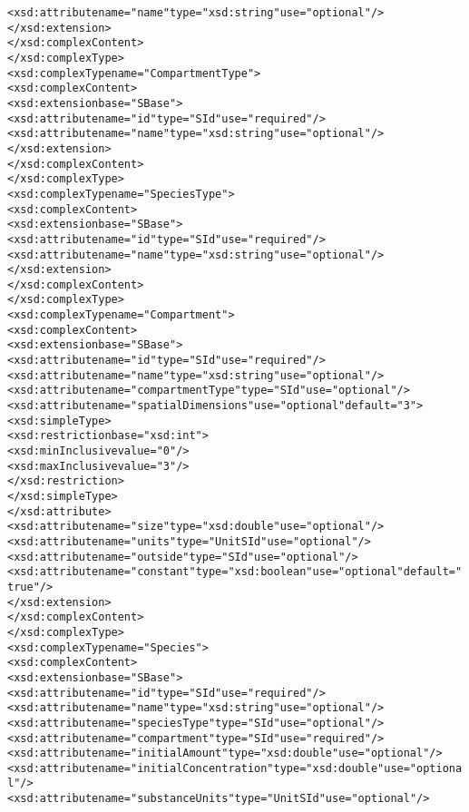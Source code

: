 \begin{alltt}
                <xsd:attribute name="name" type="xsd:string" use="optional"/>
            </xsd:extension>
        </xsd:complexContent>
    </xsd:complexType>
    <xsd:complexType name="CompartmentType">
        <xsd:complexContent>
            <xsd:extension base="SBase">
                <xsd:attribute name="id" type="SId" use="required"/>
                <xsd:attribute name="name" type="xsd:string" use="optional"/>
            </xsd:extension>
        </xsd:complexContent>
    </xsd:complexType>
    <xsd:complexType name="SpeciesType">
        <xsd:complexContent>
            <xsd:extension base="SBase">
                <xsd:attribute name="id" type="SId" use="required"/>
                <xsd:attribute name="name" type="xsd:string" use="optional"/>
            </xsd:extension>
        </xsd:complexContent>
    </xsd:complexType>
    <xsd:complexType name="Compartment">
        <xsd:complexContent>
            <xsd:extension base="SBase">
                <xsd:attribute name="id" type="SId" use="required"/>
                <xsd:attribute name="name" type="xsd:string" use="optional"/>
                <xsd:attribute name="compartmentType" type="SId" use="optional"/>
                <xsd:attribute name="spatialDimensions" use="optional" default="3">
                    <xsd:simpleType>
                        <xsd:restriction base="xsd:int">
                            <xsd:minInclusive value="0"/>
                            <xsd:maxInclusive value="3"/>
                        </xsd:restriction>
                    </xsd:simpleType>
                </xsd:attribute>
                <xsd:attribute name="size" type="xsd:double" use="optional"/>
                <xsd:attribute name="units" type="UnitSId" use="optional"/>
                <xsd:attribute name="outside" type="SId" use="optional"/>
                <xsd:attribute name="constant" type="xsd:boolean" use="optional" default="true"/>
            </xsd:extension>
        </xsd:complexContent>
    </xsd:complexType>
    <xsd:complexType name="Species">
        <xsd:complexContent>
            <xsd:extension base="SBase">
                <xsd:attribute name="id" type="SId" use="required"/>
                <xsd:attribute name="name" type="xsd:string" use="optional"/>
                <xsd:attribute name="speciesType" type="SId" use="optional"/>
                <xsd:attribute name="compartment" type="SId" use="required"/>
                <xsd:attribute name="initialAmount" type="xsd:double" use="optional"/>
                <xsd:attribute name="initialConcentration" type="xsd:double" use="optional"/>
                <xsd:attribute name="substanceUnits" type="UnitSId" use="optional"/>

\end{alltt}
